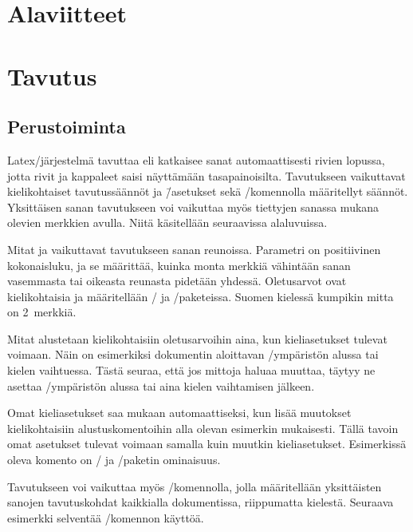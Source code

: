 \section{Alaviitteet}
\section{Tavutus}
\label{luku:tavutus}

\subsection{Perustoiminta}

Latex\-/järjestelmä tavuttaa eli katkaisee sanat automaattisesti rivien
lopussa, jotta rivit ja kappaleet saisi näyttämään tasapainoisilta.
Tavutukseen vaikuttavat kielikohtaiset tavutussäännöt ja \=/asetukset
sekä \-/komennolla määritellyt säännöt.
Yksittäisen sanan tavutukseen voi vaikuttaa myös tiettyjen sanassa
mukana olevien merkkien avulla. Niitä käsitellään seuraavissa
alaluvuissa.

Mitat  ja 
vaikuttavat tavutukseen sanan reunoissa. Parametri  on
positiivinen kokonaisluku, ja se määrittää, kuinka monta merkkiä
vähintään sanan vasemmasta tai oikeasta reunasta pidetään yhdessä.
Oletus\-arvot ovat kielikohtaisia ja määritellään
\-/{} ja \-/paketeissa. Suomen
kielessä kumpikin mitta on 2~merkkiä.

Mitat alustetaan kielikohtaisiin oletus\-arvoihin aina, kun
kie\-li\-ase\-tuk\-set tulevat voimaan. Näin on esimerkiksi dokumentin
aloittavan \-/ympäristön alussa tai kielen vaihtuessa.
Tästä seuraa, että jos mittoja ha\-luaa muuttaa, täytyy ne asettaa
\-/ympäristön alussa tai aina kielen vaihtamisen
jälkeen.

Omat kieli\-asetukset saa mukaan automaattiseksi, kun lisää muutokset
kielikohtaisiin alustuskomentoihin alla olevan esimerkin mukaisesti.
Tällä tavoin omat asetukset tulevat voimaan samalla kuin muutkin
kie\-li\-ase\-tuk\-set. Esimerkissä oleva komento 
on \-/{} ja \-/paketin ominaisuus.

\begin{koodilohkosis}
\end{koodilohkosis}

Tavutukseen voi vaikuttaa myös \-/komennolla,
jolla määritellään yksittäisten sanojen tavutuskohdat kaikkialla
dokumentissa, riippumatta kielestä. Seuraava esimerkki selventää
\-/komennon käyttöä.


